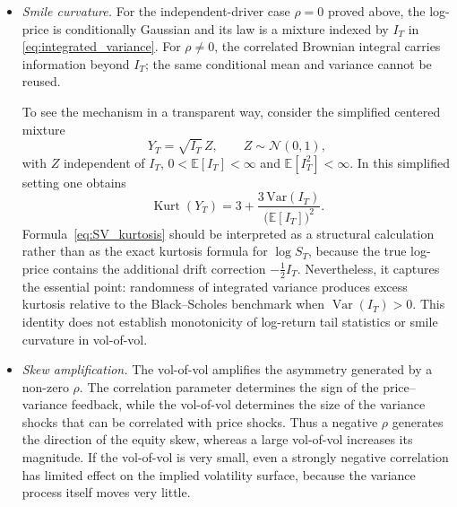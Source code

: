 \begin{itemize}[label = --]
    \item \textit{Smile curvature.} For the independent-driver case
          $\rho=0$ proved above, the log-price is conditionally Gaussian
          and its law is a mixture indexed by $I_T$ in
          \eqref{eq:integrated_variance}. For $\rho\ne0$, the
          correlated Brownian integral carries information beyond $I_T$;
          the same conditional mean and variance cannot be reused.

          To see the mechanism in a transparent way, consider the
          simplified centered mixture
          \[
          Y_T=\sqrt{I_T}\,Z,
          \qquad Z\sim\mathcal{N}(0,1),
          \]
          with $Z$ independent of $I_T$, $0<\mathbb E[I_T]<\infty$
          and $\mathbb E[I_T^2]<\infty$. In this simplified setting one obtains
          \begin{equation}\label{eq:SV_kurtosis}
          \operatorname{Kurt}(Y_T)
          =
          3+
          \frac{3\,\mathrm{Var}(I_T)}
          {\bigl(\mathbb{E}[I_T]\bigr)^2}.
          \end{equation}
          Formula~\eqref{eq:SV_kurtosis} should be interpreted as a
          structural calculation rather than as the exact kurtosis
          formula for $\log S_T$, because the true log-price contains
          the additional drift correction $-\frac12 I_T$. Nevertheless,
          it captures the essential point: randomness of integrated
          variance produces excess kurtosis relative to the
          Black--Scholes benchmark when $\operatorname{Var}(I_T)>0$.
          This identity does not establish monotonicity of log-return
          tail statistics or smile curvature in vol-of-vol.

    \item \textit{Skew amplification.} The vol-of-vol amplifies the
          asymmetry generated by a non-zero $\rho$. The correlation
          parameter determines the sign of the price--variance feedback,
          while the vol-of-vol determines the size of the variance
          shocks that can be correlated with price shocks. Thus a
          negative $\rho$ generates the direction of the equity skew,
          whereas a large vol-of-vol increases its magnitude. If the
          vol-of-vol is very small, even a strongly negative correlation
          has limited effect on the implied volatility surface, because
          the variance process itself moves very little.
\end{itemize}

